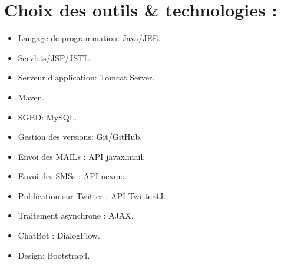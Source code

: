\documentclass[12pt,a4paper,twoside]{report}
\begin{document}
	\section{Choix des outils \& technologies :}{
			\begin{itemize}[label=\textbullet]
				\item Langage de programmation: Java/JEE.
				\item Servlets/JSP/JSTL.
				\item Serveur d'application: Tomcat Server.
				\item Maven.
				\item SGBD: MySQL.
				\item Gestion des versions: Git/GitHub.
				\item Envoi des MAILs : API javax.mail.
				\item Envoi des SMSs : API nexmo.
				\item Publication sur Twitter : API Twitter4J.
				\item Traitement asynchrone : AJAX.
				\item ChatBot : DialogFlow.
				\item Design: Bootstrap4.
			\end{itemize}
	}
\end{document}
